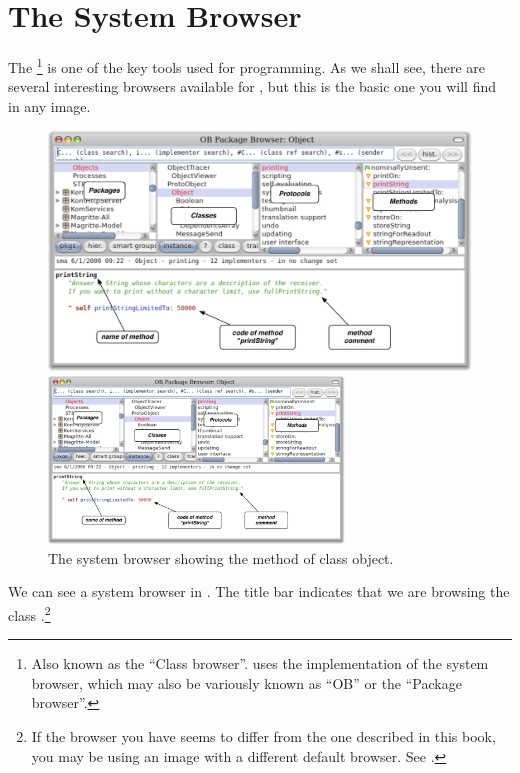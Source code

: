 \documentclass[a4paper,10pt,twoside]{book}
\begin{document}
\section{The System Browser}

The \footnote{Also known as the ``Class browser''. \pharo uses the  implementation of the system browser, which may also be variously known as ``OB'' or the ``Package browser''.} is one of the key tools used for programming.
As we shall see, there are several interesting browsers available for \pharo, but this is the basic one you will find in any image.


\begin{figure}[htb]
\ifluluelse
	{\centerline {\includegraphics[width=\textwidth]{ClassBrowser1}}}
	{\centerline {\includegraphics[width=0.7\textwidth]{ClassBrowser1}}}
\caption{The system browser showing the  method of class object.
\label{fig:classBrowser}}
\end{figure}

We can see a system browser in .
The title bar indicates that we are browsing the class .\footnote{If the browser you have seems to differ from the one described in this book, you may be using an image with a different default browser. See .}
\end{document}
